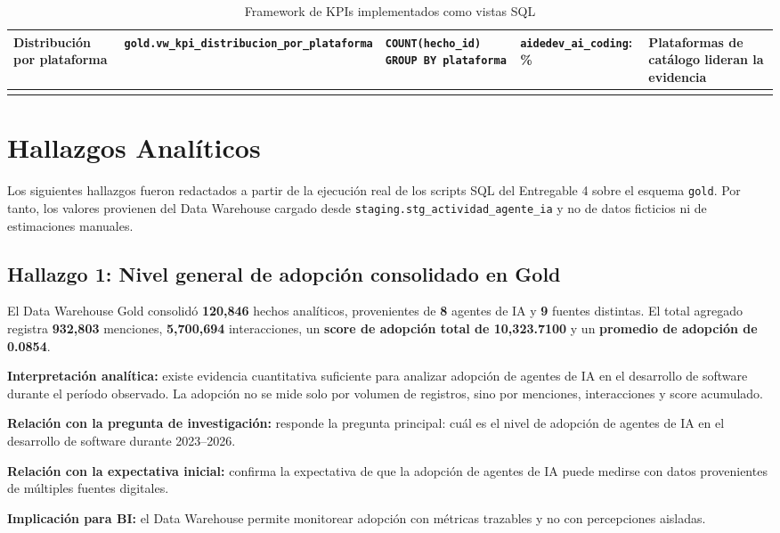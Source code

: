 \documentclass[12pt,a4paper]{article}
\newcommand{\StagingTabla}{\texttt{staging.\allowbreak stg\_actividad\_\allowbreak agente\_ia}}
\newcommand{\pathcode}[1]{\begingroup\scriptsize\ttfamily\nolinkurl{#1}\endgroup}
\begin{document}
\begin{longtable}{|P{2.5cm}|P{3.5cm}|P{3.2cm}|P{3.3cm}|P{2.5cm}|}
Distribuci\'on por plataforma & \pathcode{gold.vw_kpi_distribucion_por_plataforma} & \texttt{COUNT(hecho\_id)} \newline \texttt{GROUP BY plataforma} & \pathcode{aidedev_ai_coding}: \% & Plataformas de cat\'alogo lideran la evidencia \\ \hline
\caption{Framework de KPIs implementados como vistas SQL}
\end{longtable}
\normalsize

\section{Hallazgos Anal\'iticos}

Los siguientes hallazgos fueron redactados a partir de la ejecuci\'on real de los scripts SQL del Entregable 4 sobre el esquema \texttt{gold}. Por tanto, los valores provienen del Data Warehouse cargado desde \StagingTabla{} y no de datos ficticios ni de estimaciones manuales.

\subsection*{Hallazgo 1: Nivel general de adopci\'on consolidado en Gold}

El Data Warehouse Gold consolid\'o \textbf{120,846} hechos anal\'iticos, provenientes de \textbf{8} agentes de IA y \textbf{9} fuentes distintas. El total agregado registra \textbf{932,803} menciones, \textbf{5,700,694} interacciones, un \textbf{score de adopci\'on total de 10,323.7100} y un \textbf{promedio de adopci\'on de 0.0854}.

\textbf{Interpretaci\'on anal\'itica:} existe evidencia cuantitativa suficiente para analizar adopci\'on de agentes de IA en el desarrollo de software durante el per\'iodo observado. La adopci\'on no se mide solo por volumen de registros, sino por menciones, interacciones y score acumulado.

\textbf{Relaci\'on con la pregunta de investigaci\'on:} responde la pregunta principal: cu\'al es el nivel de adopci\'on de agentes de IA en el desarrollo de software durante 2023--2026.

\textbf{Relaci\'on con la expectativa inicial:} confirma la expectativa de que la adopci\'on de agentes de IA puede medirse con datos provenientes de m\'ultiples fuentes digitales.

\textbf{Implicaci\'on para BI:} el Data Warehouse permite monitorear adopci\'on con m\'etricas trazables y no con percepciones aisladas.
\end{document}
